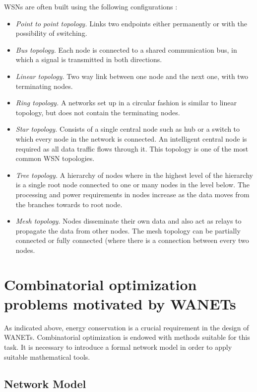 WSNs are often built using the following configurations \cite{mcgrath13}:

\begin{itemize}
\item \emph{Point to point topology.} Links two endpoints either permanently or with the possibility of switching.
\item \emph{Bus topology.} Each node is connected to a shared communication bus, in which a signal is transmitted in both directions. 
\item \emph{Linear topology.} Two way link between one node and the next one, with two terminating nodes.
\item \emph{Ring topology.} A networks set up in a circular fashion is similar to linear topology, but does not contain the terminating nodes.
\item \emph{Star topology.} Consists of a single central node such as hub or a switch to which every node in the network is connected. 
An intelligent central node is required as all data traffic flows through it.
This topology is one of the most common WSN topologies.
\item \emph{Tree topology.} A hierarchy of nodes where in the highest level of the hierarchy is a single root node connected to one or many nodes in the level below.
The processing and power requirements in nodes increase as the data moves from the branches towards to root node.
\item \emph{Mesh topology.} Nodes disseminate their own data and also act as relays to propagate the data from other nodes.
The mesh topology can be partially connected  or fully connected (where there is a connection between every two nodes.
\end{itemize}

\section{Combinatorial optimization problems motivated by WANETs}

As indicated above, energy conservation is a crucial requirement in the design of WANETs. 
Combinatorial optimization is endowed with methods suitable for this task. 
It is necessary to introduce a formal network model in order to apply suitable mathematical tools.

\subsection{Network Model}

